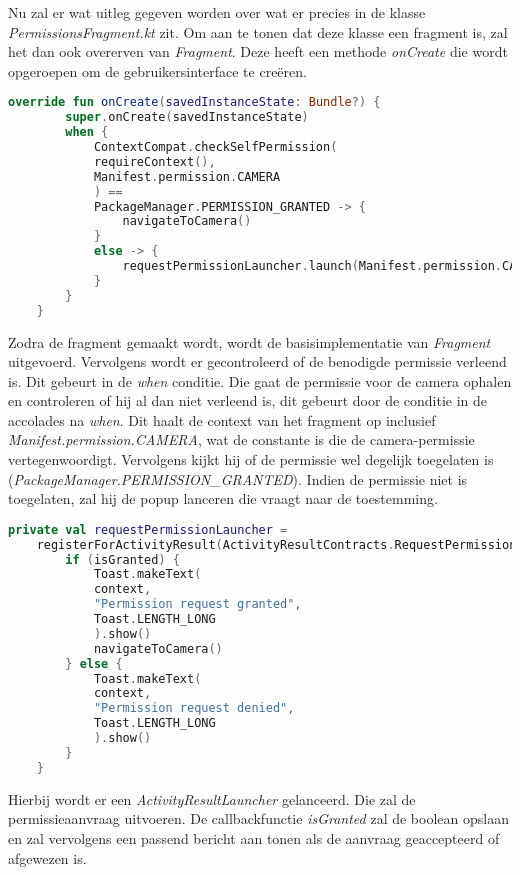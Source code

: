 Nu zal er wat uitleg gegeven worden over wat er precies in de klasse \emph{PermissionsFragment.kt} zit. Om aan te tonen dat deze klasse een fragment is, zal het dan ook overerven van \emph{Fragment}. Deze heeft een methode \emph{onCreate} die wordt opgeroepen om de gebruikersinterface te creëren.
\begin{lstlisting}[language=Kotlin,caption=override fun onCreate(savedInstanceState: Bundle?) in PermissionsFragment.kt]
    override fun onCreate(savedInstanceState: Bundle?) {
        super.onCreate(savedInstanceState)
        when {
            ContextCompat.checkSelfPermission(
            requireContext(),
            Manifest.permission.CAMERA
            ) ==
            PackageManager.PERMISSION_GRANTED -> {
                navigateToCamera()
            }
            else -> {
                requestPermissionLauncher.launch(Manifest.permission.CAMERA)
            }
        }
    }
\end{lstlisting}
Zodra de fragment gemaakt wordt, wordt de basisimplementatie van \emph{Fragment} uitgevoerd. Vervolgens wordt er gecontroleerd of de benodigde permissie verleend is. Dit gebeurt in de \emph{when} conditie. Die gaat de permissie voor de camera ophalen en controleren of hij al dan niet verleend is, dit gebeurt door de conditie in de accolades na \emph{when}. Dit haalt de context van het fragment op inclusief \emph{Manifest.permission.CAMERA}, wat de constante is die de camera-permissie vertegenwoordigt. Vervolgens kijkt hij of de permissie wel degelijk toegelaten is (\emph{PackageManager.PERMISSION\_GRANTED}). Indien de permissie niet is toegelaten, zal hij de popup lanceren die vraagt naar de toestemming.

\begin{lstlisting}[language=Kotlin, caption=requestPermissionLauncher in PermissionsFragment.kt]
    private val requestPermissionLauncher =
    registerForActivityResult(ActivityResultContracts.RequestPermission()) { isGranted: Boolean ->
        if (isGranted) {
            Toast.makeText(
            context,
            "Permission request granted",
            Toast.LENGTH_LONG
            ).show()
            navigateToCamera()
        } else {
            Toast.makeText(
            context,
            "Permission request denied",
            Toast.LENGTH_LONG
            ).show()
        }
    }
\end{lstlisting}
Hierbij wordt er een \emph{ActivityResultLauncher} gelanceerd. Die zal de permissieaanvraag uitvoeren. De callbackfunctie \emph{isGranted} zal de boolean opslaan en zal vervolgens een passend bericht aan tonen als de aanvraag geaccepteerd of afgewezen is.

